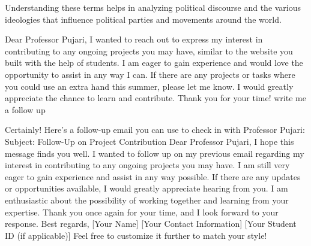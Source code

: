 \begin{botresponse}
Understanding these terms helps in analyzing political discourse and the various ideologies that influence political parties and movements around the world.

\end{botresponse}

\begin{userprompt}

Dear Professor Pujari,
I wanted to reach out to express my interest in contributing to any ongoing projects you may have, similar to the website you built with the help of students. I am eager to gain experience and would love the opportunity to assist in any way I can.
If there are any projects or tasks where you could use an extra hand this summer, please let me know. I would greatly appreciate the chance to learn and contribute.
Thank you for your time!
write me a follow up

\end{userprompt}

\begin{botresponse}

Certainly! Here’s a follow-up email you can use to check in with Professor Pujari:
Subject: Follow-Up on Project Contribution
Dear Professor Pujari,
I hope this message finds you well. I wanted to follow up on my previous email regarding my interest in contributing to any ongoing projects you may have. I am still very eager to gain experience and assist in any way possible.
If there are any updates or opportunities available, I would greatly appreciate hearing from you. I am enthusiastic about the possibility of working together and learning from your expertise.
Thank you once again for your time, and I look forward to your response.
Best regards,
[Your Name]
[Your Contact Information]
[Your Student ID (if applicable)]
Feel free to customize it further to match your style!

\end{botresponse}

